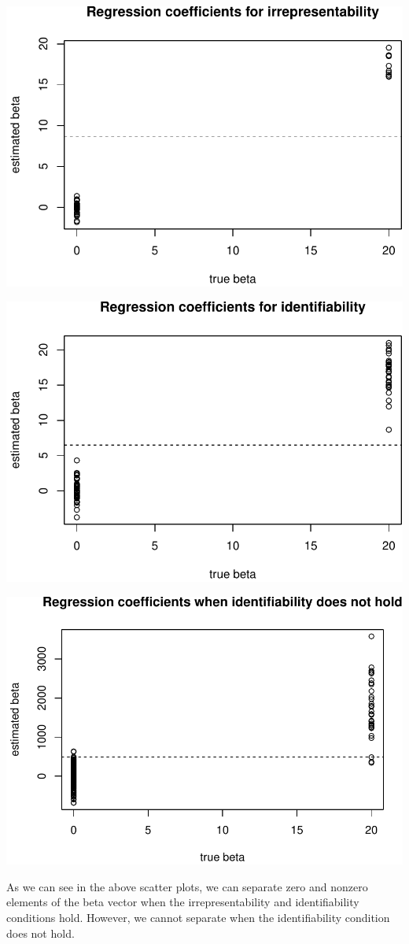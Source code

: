 \documentclass[
]{article}
\begin{document}
\includegraphics[width=0.8\linewidth]{report_files/figure-latex/unnamed-chunk-17-1}

\includegraphics[width=0.8\linewidth]{report_files/figure-latex/unnamed-chunk-17-2}

\includegraphics[width=0.8\linewidth]{report_files/figure-latex/unnamed-chunk-17-3}

As we can see in the above scatter plots, we can separate zero and
nonzero elements of the beta vector when the irrepresentability and
identifiability conditions hold. However, we cannot separate when the
identifiability condition does not hold.
\end{document}
